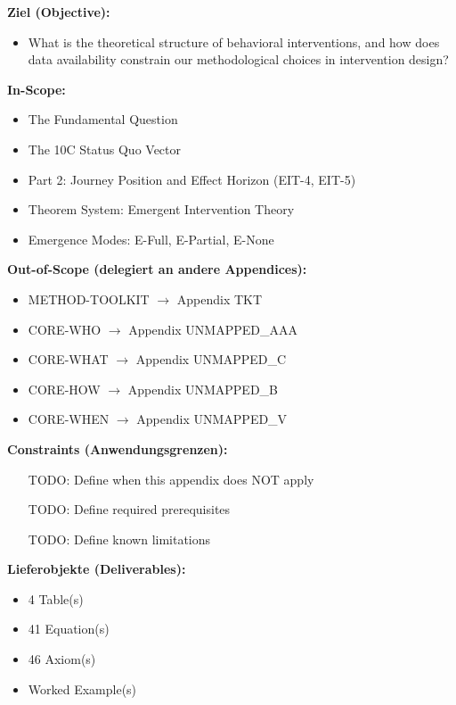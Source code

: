
\begin{tcolorbox}[
    colback=orange!5!white,
    colframe=orange!75!black,
    title={\textbf{Appendix Scope: Ziel / In-Scope / Out-of-Scope / Constraints}},
    fonttitle=\bfseries
]

\textbf{Ziel (Objective):}
\begin{itemize}[nosep]
    \item What is the theoretical structure of behavioral interventions, and how does data availability constrain our methodological choices in intervention design?
\end{itemize}

\textbf{In-Scope:}
\begin{itemize}[nosep]
    \item The Fundamental Question
    \item The 10C Status Quo Vector
    \item Part 2: Journey Position and Effect Horizon (EIT-4, EIT-5)
    \item Theorem System: Emergent Intervention Theory
    \item Emergence Modes: E-Full, E-Partial, E-None
\end{itemize}

\textbf{Out-of-Scope (delegiert an andere Appendices):}
\begin{itemize}[nosep]
    \item METHOD-TOOLKIT $\rightarrow$ Appendix TKT
    \item CORE-WHO $\rightarrow$ Appendix UNMAPPED_AAA
    \item CORE-WHAT $\rightarrow$ Appendix UNMAPPED_C
    \item CORE-HOW $\rightarrow$ Appendix UNMAPPED_B
    \item CORE-WHEN $\rightarrow$ Appendix UNMAPPED_V
\end{itemize}

\textbf{Constraints (Anwendungsgrenzen):}
\begin{itemize}[nosep]
    \item [TODO: Define when this appendix does NOT apply]
    \item [TODO: Define required prerequisites]
    \item [TODO: Define known limitations]
\end{itemize}

\textbf{Lieferobjekte (Deliverables):}
\begin{itemize}[nosep]
    \item 4 Table(s)
    \item 41 Equation(s)
    \item 46 Axiom(s)
    \item Worked Example(s)
\end{itemize}

\end{tcolorbox}


